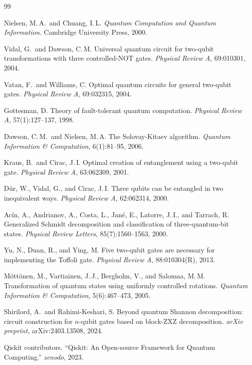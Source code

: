 \documentclass[12pt, a4paper, oneside]{report}
\theoremstyle{plain}
\theoremstyle{definition}
\theoremstyle{remark}
\begin{document}
\begin{thebibliography}{99}

	Nielsen, M.\,A.\ and Chuang, I.\,L.
	\textit{Quantum Computation and Quantum Information}.
	Cambridge University Press, 2000.

	Vidal, G.\ and Dawson, C.\,M.
	Universal quantum circuit for two-qubit transformations with three controlled-NOT gates.
	\textit{Physical Review A}, 69:010301, 2004.

	Vatan, F.\ and Williams, C.
	Optimal quantum circuits for general two-qubit gates.
	\textit{Physical Review A}, 69:032315, 2004.

	Gottesman, D.
	Theory of fault-tolerant quantum computation.
	\textit{Physical Review A}, 57(1):127--137, 1998.

	Dawson, C.\,M.\ and Nielsen, M.\,A.
	The Solovay-Kitaev algorithm.
	\textit{Quantum Information \& Computation}, 6(1):81--95, 2006.

	Kraus, B.\ and Cirac, J.\,I.
	Optimal creation of entanglement using a two-qubit gate.
	\textit{Physical Review A}, 63:062309, 2001.

	D\"{u}r, W., Vidal, G., and Cirac, J.\,I.
	Three qubits can be entangled in two inequivalent ways.
	\textit{Physical Review A}, 62:062314, 2000.

	Ac\'{i}n, A., Andrianov, A., Costa, L., Jan\'{e}, E., Latorre, J.\,I., and Tarrach, R.
	Generalized Schmidt decomposition and classification of three-quantum-bit states.
	\textit{Physical Review Letters}, 85(7):1560--1563, 2000.

	Yu, N., Duan, R., and Ying, M.
	Five two-qubit gates are necessary for implementing the Toffoli gate.
	\textit{Physical Review A}, 88:010304(R), 2013.

	M\"{o}tt\"{o}nen, M., Vartiainen, J.\,J., Bergholm, V., and Salomaa, M.\,M.
	Transformation of quantum states using uniformly controlled rotations.
	\textit{Quantum Information \& Computation}, 5(6):467--473, 2005.

	Shirilord, A.\ and Rahimi-Keshari, S.
	Beyond quantum Shannon decomposition: circuit construction for $n$-qubit gates based on
	block-ZXZ decomposition.
	\textit{arXiv preprint}, arXiv:2403.13508, 2024.

	 Qiskit contributors. ``Qiskit: An Open-source Framework for Quantum Computing.'' \textit{zenodo}, 2023.

\end{thebibliography}
\end{document}
